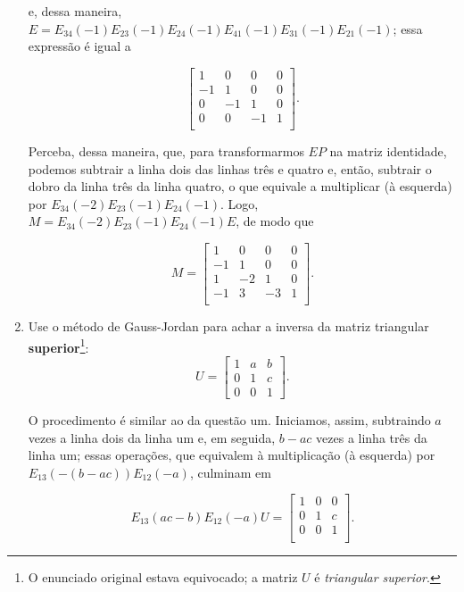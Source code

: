 \documentclass[leqno]{article}
\begin{document}
\begin{enumerate}
\begin{sol}
	\noindent e, dessa maneira, $E = E_{34}(-1)E_{23}(-1)E_{24}(-1)E_{41}(-1)E_{31}(-1)E_{21}(-1)$; essa expressão é igual a 

	\begin{equation*} 
		\begin{bmatrix} 
			1 & 0 & 0 & 0 \\ 
			-1 & 1 & 0 & 0 \\ 
			0 & -1 & 1 & 0 \\ 
			0 & 0 & -1 & 1 \\ 
		\end{bmatrix}.  
	\end{equation*} 

	\noindent Perceba, dessa maneira, que, para transformarmos $EP$ na matriz identidade, podemos subtrair a linha dois das linhas três e quatro e, então, subtrair o dobro da linha três da linha quatro, o que equivale a multiplicar (à esquerda) por $E_{34}(-2)E_{23}(-1)E_{24}(-1)$. Logo, $M = E_{34}(-2)E_{23}(-1)E_{24}(-1)E$, de modo que 

	\begin{equation*} 
		M = 
		\begin{bmatrix} 
			1 & 0 & 0 & 0 \\ 
			-1 & 1 & 0 & 0 \\ 
			1 & -2 & 1 & 0 \\ 
			-1 & 3 & -3 & 1 \\ 
		\end{bmatrix}.  
	\end{equation*} 

\end{sol} 

\item Use o método de Gauss-Jordan para achar a inversa da matriz triangular \textbf{superior}\footnote{O enunciado original estava equivocado; a matriz $U$ é \textit{triangular superior}.}:
$$U = \begin{bmatrix} 1 & a & b  \\
0 & 1 & c  \\
0 & 0 & 1 
\end{bmatrix}.$$

\begin{sol} 
	O procedimento é similar ao da questão um. Iniciamos, assim, subtraindo $a$ vezes a linha dois da linha um e, em seguida, $b - ac$ vezes a linha três da linha um; essas operações, que equivalem à multiplicação (à esquerda) por $E_{13}(-(b - ac))E_{12}(-a)$, culminam em
	
	\begin{equation*} 
		E_{13}(ac - b)E_{12}(-a)U = 
		\begin{bmatrix} 
			1 & 0 & 0 \\ 
			0 & 1 & c \\ 
			0 & 0 & 1 \\ 
		\end{bmatrix}.  
	\end{equation*} 
	

\end{sol}
\end{enumerate}
\end{document}
